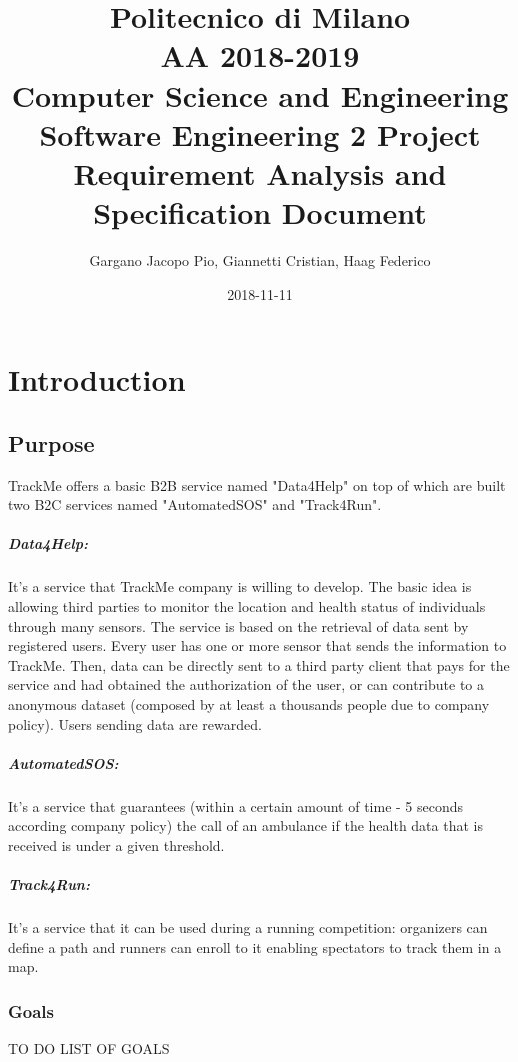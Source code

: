 \documentclass{report}
\title{
\small Politecnico di Milano\\
\small AA 2018-2019\\
\large Computer Science and Engineering\\
\Large Software Engineering 2 Project\\
\huge Requirement Analysis and Specification Document
}
\date{2018-11-11}
\author{
\large Gargano Jacopo Pio, Giannetti Cristian, Haag Federico}
\begin{document}
	\maketitle
	
	\newpage
	\tableofcontents
	
	\newpage
	\chapter{Introduction}
		\section{Purpose}
			TrackMe offers a basic B2B service named "Data4Help" on top of which are built two B2C services named "AutomatedSOS" and "Track4Run".
			\paragraph{Data4Help:} It's a service that TrackMe company is willing to develop. The basic idea is allowing third parties to monitor the location and health status of individuals through many sensors. The service is based on the retrieval of data sent by registered users. Every user has one or more sensor that sends the information to TrackMe. Then, data can be directly sent to a third party client that pays for the service and had obtained the authorization of the user, or can contribute to a anonymous dataset (composed by at least a thousands people due to company policy). Users sending data are rewarded.\\
			
			\paragraph{AutomatedSOS:}It's a service that guarantees (within a certain amount of time - 5 seconds according company policy) the call of an ambulance if the health data that is received is under a given threshold.
			
			\paragraph{Track4Run:} It's a service that it can be used during a running competition: organizers can define a path and runners can enroll to it enabling spectators to track them in a map.
			\subsection{Goals}
			TO DO LIST OF GOALS
\end{document}
